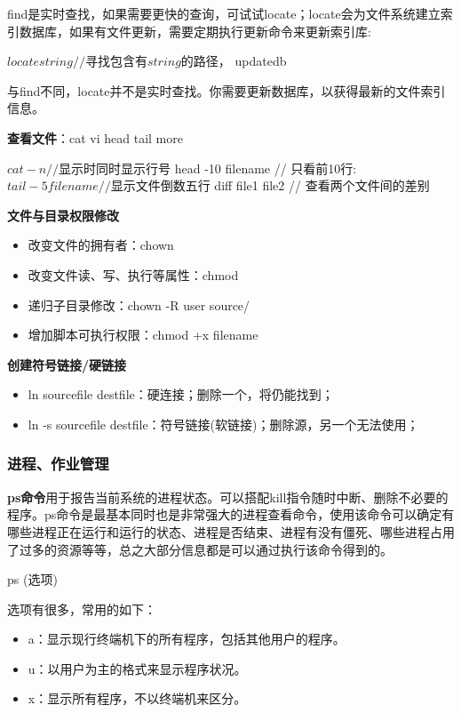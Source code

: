 find是实时查找，如果需要更快的查询，可试试locate；locate会为文件系统建立索引数据库，如果有文件更新，需要定期执行更新命令来更新索引库:

\begin{Code}
    $ locate string     //寻找包含有string的路径，
    $ updatedb
\end{Code}    

与find不同，locate并不是实时查找。你需要更新数据库，以获得最新的文件索引信息。

\textbf{查看文件}：cat vi head tail more

\begin{Code}
$ cat -n                // 显示时同时显示行号
$ head -10 filename     // 只看前10行:
$ tail -5 filename      // 显示文件倒数五行
$ diff file1 file2      // 查看两个文件间的差别
\end{Code}

\textbf{文件与目录权限修改}

\begin{itemize}
\item 改变文件的拥有者：chown
\item 改变文件读、写、执行等属性：chmod
\item 递归子目录修改：chown -R user source/
\item 增加脚本可执行权限：chmod +x filename
\end{itemize}


\textbf{创建符号链接/硬链接}

\begin{itemize}
\item ln sourcefile destfile：硬连接；删除一个，将仍能找到；
\item ln -s sourcefile destfile：符号链接(软链接)；删除源，另一个无法使用；
\end{itemize}

\subsubsection{进程、作业管理} 

\textbf{ps命令}用于报告当前系统的进程状态。可以搭配kill指令随时中断、删除不必要的程序。ps命令是最基本同时也是非常强大的进程查看命令，使用该命令可以确定有哪些进程正在运行和运行的状态、进程是否结束、进程有没有僵死、哪些进程占用了过多的资源等等，总之大部分信息都是可以通过执行该命令得到的。 

    ps (选项)

选项有很多，常用的如下：
\begin{itemize}
\item a：显示现行终端机下的所有程序，包括其他用户的程序。
\item u：以用户为主的格式来显示程序状况。
\item x：显示所有程序，不以终端机来区分。 
\end{itemize}

